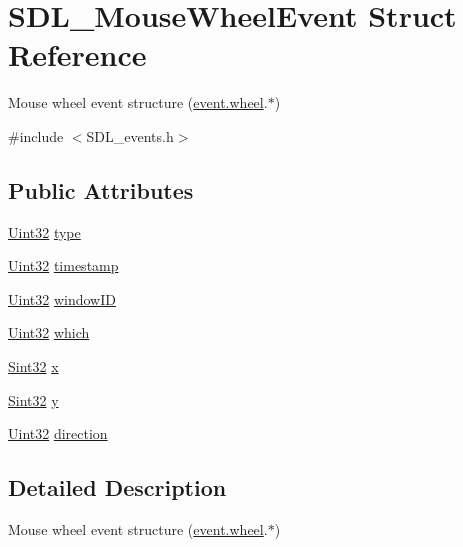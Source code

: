 \hypertarget{struct_s_d_l___mouse_wheel_event}{\section{S\-D\-L\-\_\-\-Mouse\-Wheel\-Event Struct Reference}
\label{struct_s_d_l___mouse_wheel_event}
}


Mouse wheel event structure (\hyperlink{union_s_d_l___event_a267d3f550715519ec90a81ccd0e6cbda}{event.\-wheel}.$\ast$)  




{\ttfamily \#include $<$S\-D\-L\-\_\-events.\-h$>$}

\subsection*{Public Attributes}
\begin{DoxyCompactItemize}
\item 
\hyperlink{_s_d_l__stdinc_8h_add440eff171ea5f55cb00c4a9ab8672d}{Uint32} \hyperlink{struct_s_d_l___mouse_wheel_event_aa6b741e99df708c6f9550ee0f520fb70}{type}
\item 
\hyperlink{_s_d_l__stdinc_8h_add440eff171ea5f55cb00c4a9ab8672d}{Uint32} \hyperlink{struct_s_d_l___mouse_wheel_event_a83ad52c80ff49a8e75dc6c33bba65fa0}{timestamp}
\item 
\hyperlink{_s_d_l__stdinc_8h_add440eff171ea5f55cb00c4a9ab8672d}{Uint32} \hyperlink{struct_s_d_l___mouse_wheel_event_ab45eb1895217214ecb773fc555e08f6c}{window\-I\-D}
\item 
\hyperlink{_s_d_l__stdinc_8h_add440eff171ea5f55cb00c4a9ab8672d}{Uint32} \hyperlink{struct_s_d_l___mouse_wheel_event_a014dc767d52e8b75ba26a5f12e1704e8}{which}
\item 
\hyperlink{_s_d_l__stdinc_8h_a7a90b941db9d4582e9ad7abb9940ff7e}{Sint32} \hyperlink{struct_s_d_l___mouse_wheel_event_a6d904eef474ea45a5b1828fcb5b0f859}{x}
\item 
\hyperlink{_s_d_l__stdinc_8h_a7a90b941db9d4582e9ad7abb9940ff7e}{Sint32} \hyperlink{struct_s_d_l___mouse_wheel_event_a53fdf77a464426bc8b30e629795f044b}{y}
\item 
\hyperlink{_s_d_l__stdinc_8h_add440eff171ea5f55cb00c4a9ab8672d}{Uint32} \hyperlink{struct_s_d_l___mouse_wheel_event_a9fc46552d116499e5b8ca89d66df932c}{direction}
\end{DoxyCompactItemize}


\subsection{Detailed Description}
Mouse wheel event structure (\hyperlink{union_s_d_l___event_a267d3f550715519ec90a81ccd0e6cbda}{event.\-wheel}.$\ast$) 

